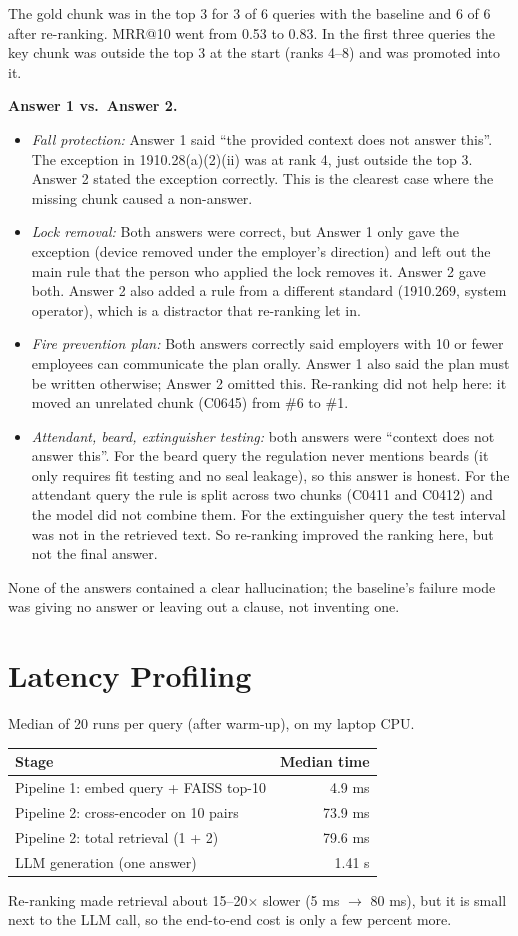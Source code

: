 \documentclass[11pt,a4paper]{article}
\begin{document}
The gold chunk was in the top 3 for 3 of 6 queries with the baseline and 6 of 6 after re-ranking. MRR@10 went from 0.53 to 0.83. In the first three queries the key chunk was outside the top 3 at the start (ranks 4--8) and was promoted into it.

\textbf{Answer 1 vs.\ Answer 2.}
\begin{itemize}
\item \emph{Fall protection:} Answer 1 said ``the provided context does not answer this''. The exception in 1910.28(a)(2)(ii) was at rank 4, just outside the top 3. Answer 2 stated the exception correctly. This is the clearest case where the missing chunk caused a non-answer.
\item \emph{Lock removal:} Both answers were correct, but Answer 1 only gave the exception (device removed under the employer's direction) and left out the main rule that the person who applied the lock removes it. Answer 2 gave both. Answer 2 also added a rule from a different standard (1910.269, system operator), which is a distractor that re-ranking let in.
\item \emph{Fire prevention plan:} Both answers correctly said employers with 10 or fewer employees can communicate the plan orally. Answer 1 also said the plan must be written otherwise; Answer 2 omitted this. Re-ranking did not help here: it moved an unrelated chunk (C0645) from \#6 to \#1.
\item \emph{Attendant, beard, extinguisher testing:} both answers were ``context does not answer this''. For the beard query the regulation never mentions beards (it only requires fit testing and no seal leakage), so this answer is honest. For the attendant query the rule is split across two chunks (C0411 and C0412) and the model did not combine them. For the extinguisher query the test interval was not in the retrieved text. So re-ranking improved the ranking here, but not the final answer.
\end{itemize}
None of the answers contained a clear hallucination; the baseline's failure mode was giving no answer or leaving out a clause, not inventing one.

\section{Latency Profiling}
Median of 20 runs per query (after warm-up), on my laptop CPU.

\begin{center}
\begin{tabular}{@{}lr@{}}
\toprule
Stage & Median time\\
\midrule
Pipeline 1: embed query + FAISS top-10 & 4.9 ms\\
Pipeline 2: cross-encoder on 10 pairs & 73.9 ms\\
Pipeline 2: total retrieval (1 + 2) & 79.6 ms\\
LLM generation (one answer) & 1.41 s\\
\bottomrule
\end{tabular}
\end{center}
Re-ranking made retrieval about 15--20$\times$ slower (5 ms $\to$ 80 ms), but it is small next to the LLM call, so the end-to-end cost is only a few percent more.
\end{document}
